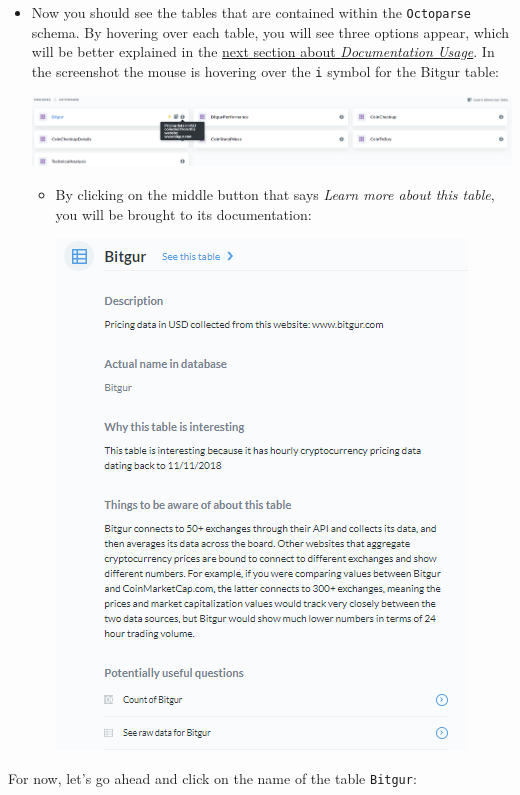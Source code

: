 \documentclass[
]{book}
\begin{document}
\begin{itemize}
\item
  Now you should see the tables that are contained within the \texttt{Octoparse} schema. By hovering over each table, you will see three options appear, which will be better explained in the \protect\hyperlink{documentation-usage}{next section about \emph{Documentation Usage}}. In the screenshot the mouse is hovering over the \texttt{i} symbol for the Bitgur table:

  \includegraphics{images/OctoparseTableOptionsHover.png}

  \begin{itemize}
  \item
    By clicking on the middle button that says \emph{Learn more about this table}, you will be brought to its documentation:

    \includegraphics{images/LearnMoreAboutThisTable.png}
  \end{itemize}
\end{itemize}

For now, let's go ahead and click on the name of the table \texttt{Bitgur}:
\end{document}
